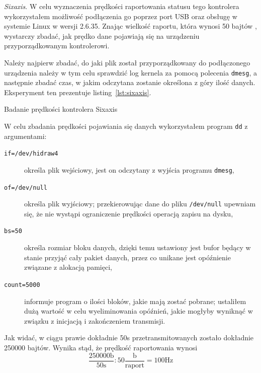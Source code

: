 \textsl{Sixaxis}. W celu wyznaczenia prędkości raportowania statusu tego kontrolera wykorzystałem możliwość podłączenia go poprzez port USB oraz obsługę w systemie Linux w wersji 2.6.35. Znając wielkość raportu, która wynosi 50 bajtów \citep{Br10}, wystarczy zbadać, jak prędko dane pojawiają się na urządzeniu przyporządkowanym kontrolerowi. 

Należy najpierw zbadać, do jaki plik został przyporządkowany do podłączonego urządzenia \ppauza należy w tym celu sprawdzić log kernela za pomocą polecenia \texttt{dmesg}, a następnie zbadać czas, w jakim odczytana zostanie określona z góry ilość danych. Eksperyment ten prezentuje listing~\ref{lst:sixaxis}.

\begin{listing}
  
  \caption{Badanie prędkości kontrolera Sixaxis}
  \label{lst:sixaxis}
\end{listing}

W celu zbadania prędkości pojawiania się danych wykorzystałem program \texttt{dd} z argumentami:
\begin{description}
 \item[\texttt{if=/dev/hidraw4}] określa plik wejściowy, jest on odczytany z wyjścia programu \texttt{dmesg},
 \item[\texttt{of=/dev/null}] określa plik wyjściowy; przekierowując dane do pliku \texttt{/dev/null} upewniam się, że nie wystąpi ograniczenie prędkości operacją zapisu na dysku,
 \item[\texttt{bs=50}] określa rozmiar bloku danych, dzięki temu ustawiony jest bufor będący w stanie przyjąć cały pakiet danych, przez co unikane jest opóźnienie związane z alokacją pamięci,
 \item[\texttt{count=5000}] informuje program o ilości bloków, jakie mają zostać pobrane; ustaliłem dużą wartość w celu wyeliminowania opóźnień, jakie mogłyby wyniknąć w związku z inicjacją i zakończeniem transmisji.
\end{description}

Jak widać, w ciągu prawie dokładnie 50s przetransmitowanych zostało dokładnie 250000 bajtów. Wynika stąd, że prędkość raportowania wynosi
\begin{equation}
 \frac{250000\textrm{b}}{50\textrm{s}} : 50\frac{\textrm{b}}{\textrm{raport}} = 100\textrm{Hz}
\end{equation}

